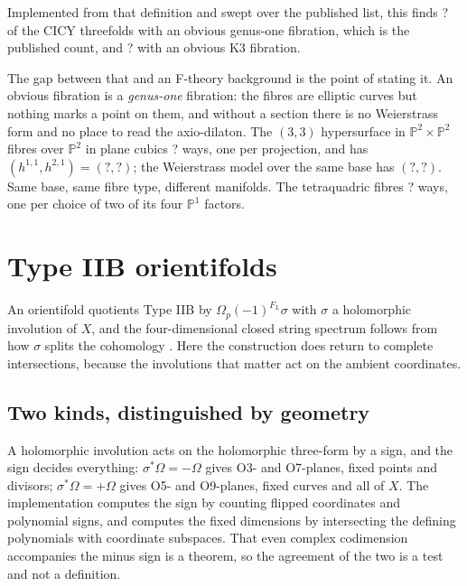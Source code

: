 \documentclass[11pt,a4paper]{article}
\newcommand{\SFPTwoHone}{?}\newcommand{\SFPTwoHtwo}{?}
\newcommand{\SFCicyElliptic}{?}\newcommand{\SFCicyKThree}{?}
\newcommand{\SFBicubicHone}{?}\newcommand{\SFBicubicHtwo}{?}
\newcommand{\SFBicubicFibrations}{?}\newcommand{\SFTetraFibrations}{?}
\newcommand{\PP}{\mathbb{P}}
\theoremstyle{definition}
\begin{document}
Implemented from that definition and swept over the published list, this finds
\SFCicyElliptic{} of the \SFCicyTotal{} CICY threefolds with an obvious
genus-one fibration, which is the published count, and \SFCicyKThree{} with an
obvious K3 fibration.

The gap between that and an F-theory background is the point of stating it. An
obvious fibration is a \emph{genus-one} fibration: the fibres are elliptic
curves but nothing marks a point on them, and without a section there is no
Weierstrass form and no place to read the axio-dilaton. The $(3,3)$
hypersurface in $\PP^2 \times \PP^2$ fibres over $\PP^2$ in plane cubics
\SFBicubicFibrations{} ways, one per projection, and has
$(h^{1,1}, h^{2,1}) = (\SFBicubicHone, \SFBicubicHtwo)$; the Weierstrass model
over the same base has $(\SFPTwoHone, \SFPTwoHtwo)$. Same base, same fibre
type, different manifolds. The tetraquadric fibres \SFTetraFibrations{} ways,
one per choice of two of its four $\PP^1$ factors.


\section{Type IIB orientifolds}
\label{sec:orientifold}

An orientifold quotients Type IIB by $\Omega_p (-1)^{F_L} \sigma$ with
$\sigma$ a holomorphic involution of $X$, and the four-dimensional closed
string spectrum follows from how $\sigma$ splits the cohomology \cite{BKLS2007, CollinucciDenefEsole2009}. Here the
construction does return to complete intersections, because the involutions
that matter act on the ambient coordinates.

\subsection{Two kinds, distinguished by geometry}

A holomorphic involution acts on the holomorphic three-form by a sign, and the
sign decides everything: $\sigma^*\Omega = -\Omega$ gives O3- and O7-planes,
fixed points and divisors; $\sigma^*\Omega = +\Omega$ gives O5- and O9-planes,
fixed curves and all of $X$. The implementation computes the sign by counting
flipped coordinates and polynomial signs, and computes the fixed dimensions by
intersecting the defining polynomials with coordinate subspaces. That even
complex codimension accompanies the minus sign is a theorem, so the agreement
of the two is a test and not a definition.
\end{document}
